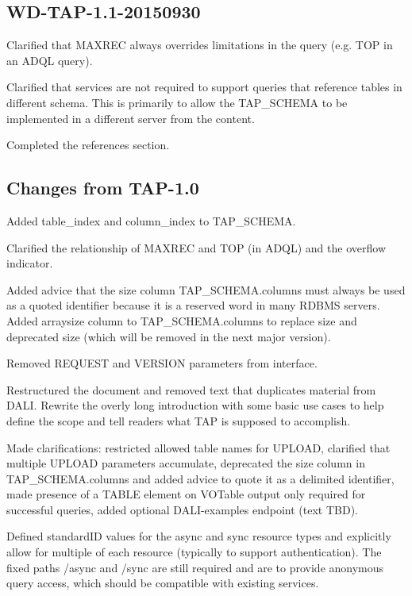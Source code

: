 \documentclass[11pt,letter]{ivoa}
\newcommand{\tapschema}{TAP\_SCHEMA}
\newcommand{\tapschema}{{%
  \relsize{-0.5}TAP\discretionary{-}{}{\kern-2pt\_}SCHEMA}}
\begin{document}
\subsection{WD-TAP-1.1-20150930}

Clarified that MAXREC always overrides limitations in the query (e.g. 
TOP in an ADQL query).

Clarified that services are not required to support queries that reference tables 
in different schema. This is primarily to allow the \tapschema{} to be implemented 
in a different server from the content.

Completed the references section.

\subsection{Changes from TAP-1.0}

Added table\_index and column\_index to \tapschema.

Clarified the relationship of MAXREC and TOP (in ADQL) and the overflow 
indicator.

Added advice that the size column \tapschema.columns must always be used 
as a quoted identifier because it is a reserved word in many RDBMS 
servers. Added arraysize column to \tapschema.columns to replace size and 
deprecated size (which will be removed in the next major version).
 
Removed REQUEST and VERSION parameters from interface.

Restructured the document and removed text that duplicates material from DALI. 
Rewrite the overly long introduction with some basic use cases to help define 
the scope and tell readers what TAP is supposed to accomplish.

Made clarifications: restricted allowed table names for UPLOAD, clarified that 
multiple UPLOAD parameters accumulate, deprecated the size column in 
\tapschema.columns and added advice to quote it as a delimited 
identifier, made presence of a TABLE element on VOTable output only required for 
successful queries, added optional DALI-examples endpoint (text TBD).

Defined standardID values for the async and sync resource types and explicitly 
allow for multiple of each resource (typically to support authentication). The 
fixed paths /async and /sync are still required and are to provide anonymous 
query access, which should be compatible with existing services.


\end{document}
